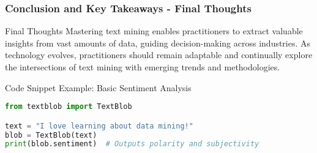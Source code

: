 \documentclass[aspectratio=169]{beamer}
\begin{document}
\begin{frame}[fragile]
    \frametitle{Conclusion and Key Takeaways - Final Thoughts}

    \begin{block}{Final Thoughts}
        Mastering text mining enables practitioners to extract valuable insights from vast amounts of data, guiding decision-making across industries. As technology evolves, practitioners should remain adaptable and continually explore the intersections of text mining with emerging trends and methodologies.
    \end{block}
    
    \begin{block}{Code Snippet Example: Basic Sentiment Analysis}
        \begin{lstlisting}[language=Python]
from textblob import TextBlob

text = "I love learning about data mining!"
blob = TextBlob(text)
print(blob.sentiment)  # Outputs polarity and subjectivity
        \end{lstlisting}
    \end{block}
\end{frame}
\end{document}
